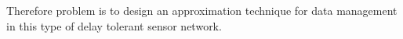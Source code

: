 \documentclass[conference]{IEEEtran}
\begin{document}
Therefore problem is to design an approximation technique for data management in this type of delay tolerant sensor 
network.
\end{document}
